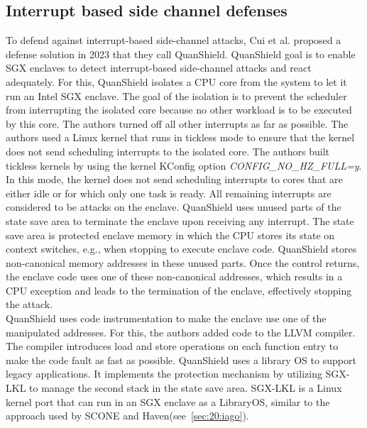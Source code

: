 \subsection{Interrupt based side channel defenses}
To defend against interrupt-based side-channel attacks, Cui et al. proposed a
defense solution in 2023 that they call QuanShield.\cite{cui_quanshield_2023}
QuanShield goal is to enable SGX enclaves to detect interrupt-based side-channel
attacks and react adequately. For this, QuanShield isolates a CPU core from the
system to let it run an Intel SGX enclave. The goal of the isolation is to
prevent the scheduler from interrupting the isolated core because no other
workload is to be executed by this core. The authors turned off all other
interrupts as far as possible. The authors used a Linux kernel that runs in
tickless mode to ensure that the kernel does not send scheduling interrupts to
the isolated core. The authors built tickless kernels by using the kernel
KConfig option \textit{CONFIG\_NO\_HZ\_FULL=y}. In this mode, the kernel does
not send scheduling interrupts to cores that are either idle or for which only
one task is ready.\cite{linuxtickless} All remaining interrupts are considered
to be attacks on the enclave. QuanShield uses unused parts of the state save
area to terminate the enclave upon receiving any interrupt. The state save area
is protected enclave memory in which the CPU stores its state on context
switches, e.g., when stopping to execute enclave code. QuanShield stores
non-canonical memory addresses in these unused parts. Once the control returns,
the enclave code uses one of these non-canonical addresses, which results in a
CPU exception and leads to the termination of the enclave, effectively stopping
the attack.\\

QuanShield uses code instrumentation to make the enclave use one of the
manipulated addresses. For this, the authors added code to the LLVM compiler.
The compiler introduces load and store operations on each function entry to make
the code fault as fast as possible. QuanShield uses a library OS to support
legacy applications. It implements the protection mechanism by utilizing SGX-LKL
to manage the second stack in the state save area. SGX-LKL is a Linux kernel
port that can run in an SGX enclave as a LibraryOS, similar to the approach used
by SCONE and Haven(see~\ref{sec:20:iago}).\cite{priebe2019sgx}

